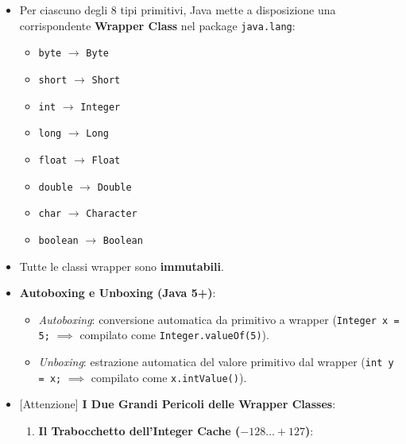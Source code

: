 \documentclass[11pt,a4paper,oneside]{report}
\newcommand{\passthrough}[1]{#1}
\providecommand{\tightlist}{\setlength{\itemsep}{0pt}\setlength{\parskip}{0pt}}
\begin{document}
\begin{itemize}
\tightlist
\item
  Per ciascuno degli 8 tipi primitivi, Java mette a disposizione una
  corrispondente \textbf{Wrapper Class} nel package
  \passthrough{\lstinline!java.lang!}:

  \begin{itemize}
  \tightlist
  \item
    \passthrough{\lstinline!byte!} \(\rightarrow\)
    \passthrough{\lstinline!Byte!}
  \item
    \passthrough{\lstinline!short!} \(\rightarrow\)
    \passthrough{\lstinline!Short!}
  \item
    \passthrough{\lstinline!int!} \(\rightarrow\)
    \passthrough{\lstinline!Integer!}
  \item
    \passthrough{\lstinline!long!} \(\rightarrow\)
    \passthrough{\lstinline!Long!}
  \item
    \passthrough{\lstinline!float!} \(\rightarrow\)
    \passthrough{\lstinline!Float!}
  \item
    \passthrough{\lstinline!double!} \(\rightarrow\)
    \passthrough{\lstinline!Double!}
  \item
    \passthrough{\lstinline!char!} \(\rightarrow\)
    \passthrough{\lstinline!Character!}
  \item
    \passthrough{\lstinline!boolean!} \(\rightarrow\)
    \passthrough{\lstinline!Boolean!}
  \end{itemize}
\item
  Tutte le classi wrapper sono \textbf{immutabili}.
\item
  \textbf{Autoboxing e Unboxing (Java 5+)}:

  \begin{itemize}
  \tightlist
  \item
    \emph{Autoboxing}: conversione automatica da primitivo a wrapper
    (\passthrough{\lstinline!Integer x = 5;!} \(\implies\) compilato
    come \passthrough{\lstinline!Integer.valueOf(5)!}).
  \item
    \emph{Unboxing}: estrazione automatica del valore primitivo dal
    wrapper (\passthrough{\lstinline!int y = x;!} \(\implies\) compilato
    come \passthrough{\lstinline!x.intValue()!}).
  \end{itemize}
\item
  {[}Attenzione{]} \textbf{I Due Grandi Pericoli delle Wrapper Classes}:

  \begin{enumerate}
  \def\labelenumi{\arabic{enumi}.}
  \item
    \textbf{Il Trabocchetto dell'Integer Cache (\(-128 \dots +127\))}:


\end{enumerate}
\end{itemize}
\end{document}
